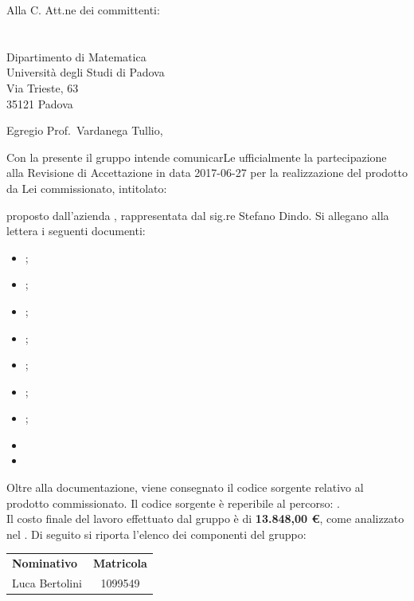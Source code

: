 \documentclass[a4paper,12pt]{letteracdp}
\date{2017-06-21}
\begin{document}
  \begin{letter}{
    Alla C. Att.ne dei committenti: \\
    \COMMITTENTE \\
    \CARDIN      \\
    Dipartimento di Matematica \\
		Università degli Studi di Padova \\
		Via Trieste, 63 \\
		35121 Padova}
		
    \opening{Egregio Prof.~Vardanega Tullio,}
    Con la presente il gruppo \GRUPPO{} intende comunicarLe ufficialmente la partecipazione alla Revisione di Accettazione in data 2017-06-27 per la realizzazione del prodotto da Lei commissionato, intitolato:
    \begin{center}
      \CAPITOLATO
    \end{center}
    proposto dall'azienda \PROPONENTE{}, rappresentata dal sig.re Stefano Dindo.
    Si allegano alla lettera i seguenti documenti:
    \begin{itemize}
      \item \Gldoc{} \Glfile{};
      \item \NPdoc{} \NPfile{};
      \item \PPdoc{} \PPfile{};
      \item \PQdoc{} \PQfile{};
      \item \ARdoc{} \ARfile{};
      \item \DPdoc{} \DPfile{};
      \item \MUdoc{} \MUfile{};
      \item {} 
      \item {} 
    \end{itemize}
    Oltre alla documentazione, viene consegnato il codice sorgente relativo al prodotto commissionato. Il codice sorgente è reperibile al percorso: .\\ Il costo finale del lavoro effettuato dal gruppo è di \textbf{13.848,00 \euro}, come analizzato nel \PPdoc{}.
    \newpage
    Di seguito si riporta l'elenco dei componenti del gruppo:\\
    \begin{center}
      \begin{tabular}{l c}
        \textbf{Nominativo} & \textbf{Matricola} \\
        Luca Bertolini 	 	& 1099549  \\

\end{tabular}
\end{center}
\end{letter}
\end{document}
